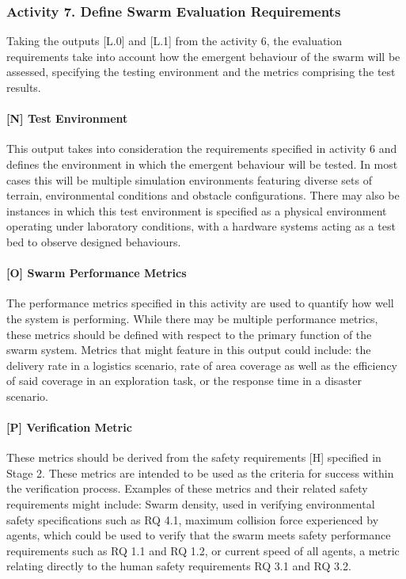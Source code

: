 \documentclass[lettersize,journal]{IEEEtran}
\begin{document}
\subsubsection*{Activity 7. Define Swarm Evaluation Requirements}

Taking the outputs [L.0] and [L.1] from the activity 6, the evaluation requirements take into account how the emergent behaviour of the swarm will be assessed, specifying the testing environment and the metrics comprising the test results.  

\paragraph*{[N] Test Environment}

This output takes into consideration the requirements specified in activity 6 and defines the environment in which the emergent behaviour will be tested. In most cases this will be multiple simulation environments featuring diverse sets of terrain, environmental conditions and obstacle configurations. There may also be instances in which this test environment is specified as a physical environment operating under laboratory conditions, with a hardware systems acting as a test bed to observe designed behaviours.

\paragraph*{[O] Swarm Performance Metrics}

The performance metrics specified in this activity are used to quantify how well the system is performing. While there may be multiple performance metrics, these metrics should be defined with respect to the primary function of the swarm system. Metrics that might feature in this output could include: the delivery rate in a logistics scenario, rate of area coverage as well as the efficiency of said coverage in an exploration task, or the response time in a disaster scenario.

\paragraph*{[P] Verification Metric}

These metrics should be derived from the safety requirements [H] specified in Stage 2. These metrics are intended to be used as the criteria for success within the verification process. Examples of these metrics and their related safety requirements might include: Swarm density, used in verifying environmental safety specifications such as RQ 4.1, maximum collision force experienced by agents, which could be used to verify that the swarm meets safety performance requirements such as RQ 1.1 and RQ 1.2, or current speed of all agents, a metric relating directly to the human safety requirements RQ 3.1 and RQ 3.2.
\end{document}
